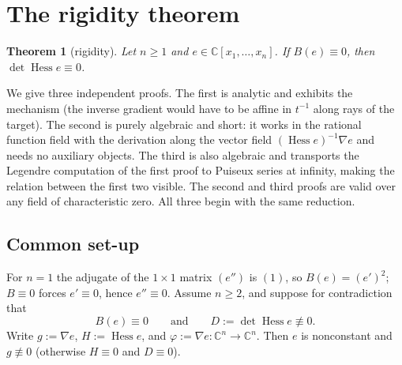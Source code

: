 \documentclass[11pt]{article}
\theoremstyle{plain}
\newtheorem{theorem}{Theorem}[section]
\theoremstyle{definition}
\newcommand{\C}{\mathbb{C}}
\newcommand{\Hess}{\operatorname{Hess}}
\begin{document}
\section{The rigidity theorem}\label{sec:G}

\begin{theorem}[rigidity]\label{thm:G}
Let $n\ge1$ and $e\in\C[x_1,\dots,x_n]$. If $B(e)\equiv0$, then
$\det\Hess e\equiv0$.
\end{theorem}

We give three independent proofs. The first is analytic and exhibits the
mechanism (the inverse gradient would have to be affine in $t^{-1}$
along rays of the target). The second is purely algebraic and short: it
works in the rational function field with the derivation along the
vector field $(\Hess e)^{-1}\nabla e$ and needs no auxiliary objects. The
third is also algebraic and transports the Legendre computation of the
first proof to Puiseux series at infinity, making the relation between
the first two visible. The second and third proofs are valid over any
field of characteristic zero. All three begin with the same reduction.

\subsection*{Common set-up}

For $n=1$ the adjugate of the $1\times1$ matrix $(e'')$ is $(1)$, so
$B(e)=(e')^2$; $B\equiv0$ forces $e'\equiv0$, hence $e''\equiv0$. Assume
$n\ge2$, and suppose for contradiction that
\[
B(e)\equiv0\qquad\text{and}\qquad D:=\det\Hess e\not\equiv0 .
\]
Write $g:=\nabla e$, $H:=\Hess e$, and $\varphi:=\nabla e:\C^n\to\C^n$.
Then $e$ is nonconstant and $g\not\equiv0$ (otherwise $H\equiv0$ and
$D\equiv0$).
\end{document}
